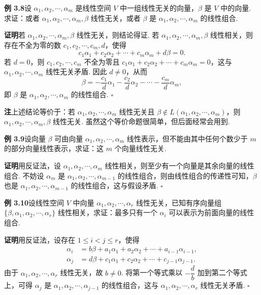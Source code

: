 \documentclass[UTF8,12pt,a4paper,fontset=fandol]{ctexart}
\begin{document}
\noindent\textbf{例 3.8}\quad 设 $\alpha_1,\alpha_2,\cdots,\alpha_m$ 是线性空间 $V$ 中一组线性无关的向量，$\beta$ 是 $V$ 中的向量. 求证：或者 $\alpha_1,\alpha_2,\cdots,\alpha_m,\beta$ 线性无关，或者 $\beta$ 是 $\alpha_1,\alpha_2,\cdots,\alpha_m$ 的线性组合.

\noindent\textbf{证明}\quad 若 $\alpha_1,\alpha_2,\cdots,\alpha_m,\beta$ 线性无关，则结论得证. 若 $\alpha_1,\alpha_2,\cdots,\alpha_m,\beta$ 线性相关，则存在不全为零的数 $c_1,c_2,\cdots,c_m,d$，使得
\[
c_1\alpha_1+c_2\alpha_2+\cdots+c_m\alpha_m+d\beta=0.
\]
若 $d=0$，则 $c_1,c_2,\cdots,c_m$ 不全为零且 $c_1\alpha_1+c_2\alpha_2+\cdots+c_m\alpha_m=0$，这与 $\alpha_1,\alpha_2,\cdots,\alpha_m$ 线性无关矛盾. 因此 $d\ne 0$，从而
\[
\beta=-\frac{c_1}{d}\alpha_1-\frac{c_2}{d}\alpha_2-\cdots-\frac{c_m}{d}\alpha_m,
\]
即 $\beta$ 是 $\alpha_1,\alpha_2,\cdots,\alpha_m$ 的线性组合. $\square$

\noindent\textbf{注}\quad 上述结论等价于：若 $\alpha_1,\alpha_2,\cdots,\alpha_m$ 线性无关且 $\beta\notin L(\alpha_1,\alpha_2,\cdots,\alpha_m)$，则 $\alpha_1,\alpha_2,\cdots,\alpha_m,\beta$ 线性无关. 虽然这个等价命题很简单，但后面经常会用到.

\noindent\textbf{例 3.9}\quad 设向量 $\beta$ 可由向量 $\alpha_1,\alpha_2,\cdots,\alpha_m$ 线性表示，但不能由其中任何个数少于 $m$ 的部分向量线性表示，求证：这 $m$ 个向量线性无关.

\noindent\textbf{证明}\quad 用反证法，设 $\alpha_1,\alpha_2,\cdots,\alpha_m$ 线性相关，则至少有一个向量是其余向量的线性组合. 不妨设 $\alpha_m$ 是 $\alpha_1,\alpha_2,\cdots,\alpha_{m-1}$ 的线性组合，则由线性组合的传递性可知，$\beta$ 也是 $\alpha_1,\alpha_2,\cdots,\alpha_{m-1}$ 的线性组合，这与假设矛盾. $\square$

\noindent\textbf{例 3.10}\quad 设线性空间 $V$ 中向量 $\alpha_1,\alpha_2,\cdots,\alpha_r$ 线性无关，已知有序向量组 $\{\beta,\alpha_1,\alpha_2,\cdots,\alpha_r\}$ 线性相关，求证：最多只有一个 $\alpha_i$ 可以表示为前面向量的线性组合.

\noindent\textbf{证明}\quad 用反证法，设存在 $1\le i<j\le r$，使得
\[
\begin{aligned}
\alpha_i&=b\beta+a_1\alpha_1+a_2\alpha_2+\cdots+a_{i-1}\alpha_{i-1},\\
\alpha_j&=d\beta+c_1\alpha_1+c_2\alpha_2+\cdots+c_{j-1}\alpha_{j-1}.
\end{aligned}
\]
由于 $\alpha_1,\alpha_2,\cdots,\alpha_r$ 线性无关，故 $b\ne 0$. 将第一个等式乘以 $-\dfrac{d}{b}$ 加到第二个等式上，可得 $\alpha_j$ 是 $\alpha_1,\alpha_2,\cdots,\alpha_{j-1}$ 的线性组合，这与 $\alpha_1,\alpha_2,\cdots,\alpha_r$ 线性无关矛盾. $\square$
\end{document}
